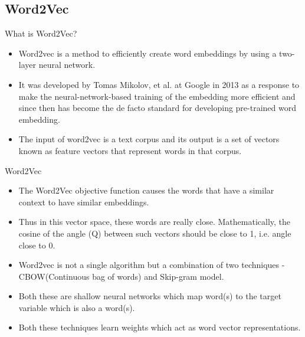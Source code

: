 \documentclass[11pt]{beamer}
\begin{document}
\subsection{Word2Vec \\ \scalebox{0.8}{}}
\begin{frame}{What is Word2Vec?}
	\begin{itemize}
		\item Word2vec is a method to efficiently create word embeddings by using a two-layer neural network.  
		\item It was developed by Tomas Mikolov, et al. at Google in 2013 as a response to make the neural-network-based training of the embedding more efficient and since then has become the de facto standard for developing pre-trained word embedding. 		  
		\item The input of word2vec is a text corpus and its output is a set of vectors known as feature vectors that represent words in that corpus. 
		
	\end{itemize}
\end{frame}
\begin{frame}{Word2Vec}
	\begin{itemize}
	\item The Word2Vec objective function causes the words that have a similar context to have similar embeddings. 
		\item Thus in this vector space, these words are really close. Mathematically, the cosine of the angle (Q) between such vectors should be close to 1, i.e. angle close to 0.
		\item Word2vec is not a single algorithm but a combination of two techniques - CBOW(Continuous bag of words) and Skip-gram model.
		\item Both these are shallow neural networks which map word(s) to the target variable which is also a word(s). 
		\item Both these techniques learn weights which act as word vector representations. 
	\end{itemize}
\end{frame}
\end{document}
